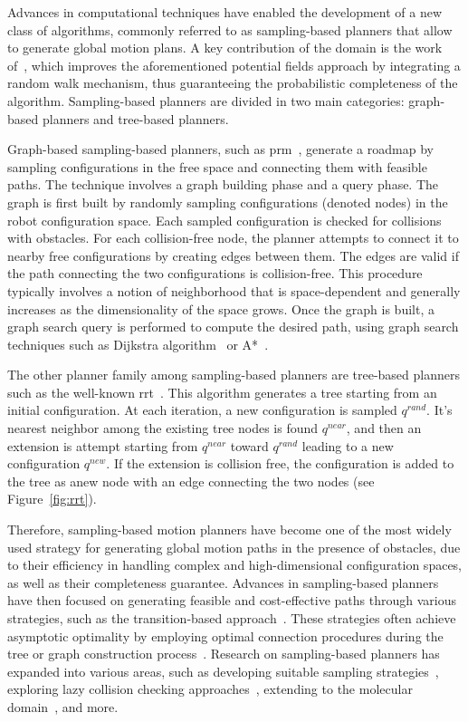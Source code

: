 Advances in computational techniques have enabled the development of a new class of algorithms, commonly referred to as sampling-based planners that allow to generate global motion plans.
A key contribution of the domain is the work of~\cite{cLatombe}, which improves the aforementioned potential fields approach by integrating a random walk mechanism, thus guaranteeing the probabilistic completeness of the algorithm.
Sampling-based planners are divided in two main categories: graph-based planners and tree-based planners.

Graph-based sampling-based planners, such as \gls{prm}~\cite{cPRM}, generate a roadmap by sampling configurations in the free space and connecting them with feasible paths. 
The technique involves a graph building phase and a query phase.
The graph is first built by randomly sampling configurations (denoted nodes) in the robot configuration space.
Each sampled configuration is checked for collisions with obstacles.
For each collision-free node, the planner attempts to connect it to nearby free configurations by creating edges between them.  
The edges are valid if the path connecting the two configurations is collision-free.
This procedure typically involves a notion of neighborhood that is space-dependent and generally increases as the dimensionality of the space grows.
Once the graph is built, a graph search query is performed to compute the desired path, using graph search techniques such as Dijkstra algorithm~\cite{cDijk} or A*~\cite{cA*}.

The other planner family among sampling-based planners are tree-based planners such as the well-known \gls{rrt}~\cite{cRRT}.
This algorithm generates a tree starting from an initial configuration.
At each iteration, a new configuration is sampled $q^{rand}$.
It's nearest neighbor among the existing tree nodes is found $q^{near}$, and then an extension is attempt starting from $q^{near}$ toward $q^{rand}$ leading to a new configuration $q^{new}$.
If the extension is collision free, the configuration is added to the tree as anew node with an edge connecting the two nodes (see Figure~\ref{fig:rrt}).

Therefore, sampling-based motion planners have become one of the most widely used strategy for generating global motion paths in the presence of obstacles, due to their efficiency in handling complex and high-dimensional configuration spaces, as well as their completeness guarantee.
Advances in sampling-based planners have then focused on generating feasible and cost-effective paths through various strategies, such as the transition-based approach~\cite{cTRRT}. 
These strategies often achieve asymptotic optimality by employing optimal connection procedures during the tree or graph construction process~\cite{cRRTstar, cTRRTstar, cFMT}.
Research on sampling-based planners has expanded into various areas, such as developing suitable sampling strategies~\cite{cSampling}, exploring lazy collision checking approaches~\cite{cLazy1}, extending to the molecular domain~\cite{cMolecular}, and more.


